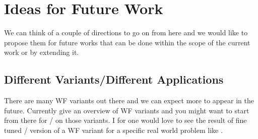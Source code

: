 



\section*{Ideas for Future Work}\label{sec:ideas_for_future_work}

We can think of a couple of directions to go on from here and we would like to propose them for future works that can be done within the scope of 
the current work  or by extending it.

\subsection*{Different Variants/Different Applications}

There are many \ac{WF}\cite{Jaganathan2015}\cite{Liu2019} variants out there and we can expect more to appear in the future. 
Currently \cite{Jaganathan2015}\cite{Liu2019}\cite{Chandra2017} give an overview of \ac{WF} variants and you might want to start from there for 
\du/\au\cite{Monga2019} on those variants. I for one would love to see the result of fine tuned 
\du/\au\cite{Monga2019} version of a \ac{WF} variant for a specific real world problem like \cite{Fogel2013}. 

